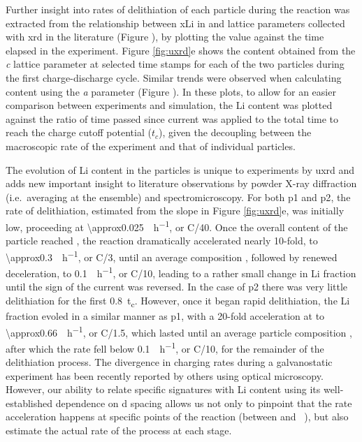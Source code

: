\documentclass{article}
\begin{document}
\newpage %
Further insight into rates of delithiation of each particle during the
reaction was extracted from the relationship between \gls{xLi} in
 and lattice parameters collected with \gls{xrd} in the
literature\cite{robert2015} (Figure ), by
plotting the value against the time elapsed in the experiment. Figure
\ref{fig:uxrd}e shows the  content obtained from the \emph{c}
lattice parameter at selected time stamps for each of the two 
particles during the first charge-discharge cycle. Similar trends were
observed when calculating  content using the \emph{a} parameter
(Figure ). In these plots, to allow for an easier
comparison between experiments and simulation, the Li content was
plotted against the ratio of time passed since current was applied to
the total time to reach the charge cutoff potential ($t_c$), given the
decoupling between the macroscopic rate of the experiment and that of
individual particles.

The evolution of Li content in the particles is unique to experiments
by \gls{uxrd} and adds new important insight to literature
observations by powder X-ray diffraction (i.e.\ averaging at the
ensemble) and
spectromicroscopy\cite{doeff2017,wolf2017,hulzen2018,ahn2017,zhou2016-2,robert2015,yoon2006,hua2018,grenier2017,chapman2020,chueh2021,
  zhao2022, rao2021, wang2020-6}. For both \gls{p1} and \gls{p2}, the
rate of delithiation, estimated from the slope in Figure
\ref{fig:uxrd}e, was initially low, proceeding at
\SI{\approx0.025}{\per\hour}, or C/40. Once the overall content
of the particle reached , the reaction dramatically
accelerated nearly 10-fold, to \SI{\approx0.3}{\per\hour}, or
C/3, until an average composition , followed by renewed
deceleration, to \SI{0.1}{\per\hour}, or C/10, leading to a
rather small change in Li fraction until the sign of the current was
reversed. In the case of \gls{p2} there was very little delithiation
for the first \SI{0.8}{t_c}. However, once it began rapid
delithiation, the Li fraction evoled in a similar manner as \gls{p1},
with a 20-fold acceleration at  to
\SI{\approx0.66}{\per\hour}, or C/1.5, which lasted until an
average particle composition , after which the rate fell below
\SI{0.1}{\per\hour}, or C/10, for the remainder of the
delithiation process. The divergence in charging rates during a
galvanostatic experiment has been recently reported by others using
optical microscopy\cite{zhao2022}. However, our ability to relate
specific signatures with Li content using its well-established
dependence on d spacing allows us not only to pinpoint that the rate
acceleration happens at specific points of the reaction (between
 and ~), but also estimate the actual rate of the
process at each stage.
\end{document}
